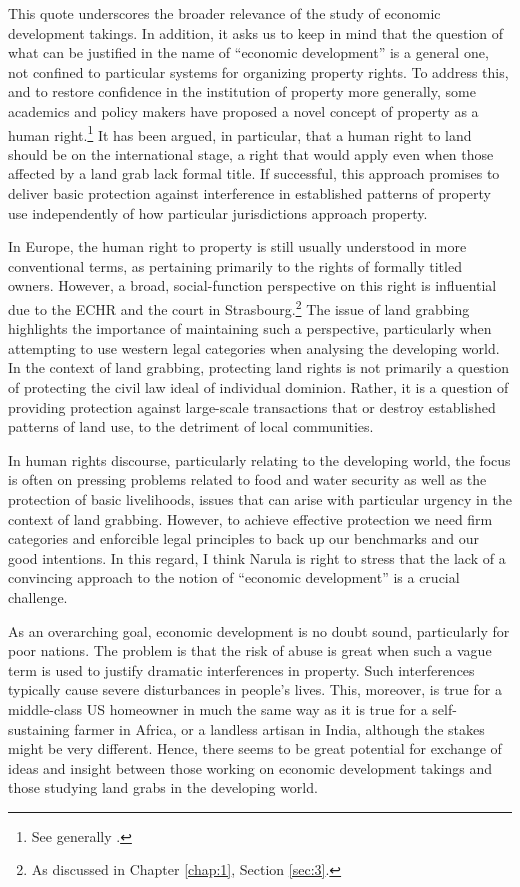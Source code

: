 This quote underscores the broader relevance of the study of economic development takings. In addition, it asks us to keep in mind that the question of what can be justified in the name of ``economic development'' is a general one, not confined to particular systems for organizing property rights. To address this, and to restore confidence in the institution of property more generally, some academics and policy makers have proposed a novel concept of property as a human right.\footnote{See generally \cite{schutter10,schutter11,kunnerman13}.} It has been argued, in particular, that a human right to land should be  on the international stage, a right that would apply even when those affected by a land grab lack formal title. If successful, this approach promises to deliver basic protection against interference in established patterns of property use independently of how particular jurisdictions approach property.

In Europe, the human right to property is still usually understood in more conventional terms, as pertaining primarily to the rights of formally titled owners. However, a broad, social-function perspective on this right is influential due to the ECHR and the court in Strasbourg.\footnote{As discussed in Chapter \ref{chap:1}, Section \ref{sec:3}.} The issue of land grabbing highlights the importance of maintaining such a perspective, particularly when attempting to use western legal categories when analysing the developing world. In the context of land grabbing, protecting land rights is not primarily a question of protecting the civil law ideal of individual dominion. Rather, it is a question of providing protection against large-scale transactions that  or destroy established patterns of land use, to the detriment of local communities. 

In human rights discourse, particularly relating to the developing world, the focus is often on pressing problems related to food and water security as well as the protection of basic livelihoods, issues that can arise with particular urgency in the context of land grabbing. However, to achieve effective protection we need firm categories and enforcible legal principles to back up our benchmarks and our good intentions. In this regard, I think Narula is right to stress that the lack of a convincing approach to the notion of ``economic development'' is a crucial challenge.

As an overarching goal, economic development is no doubt sound, particularly for poor nations. The problem is that the risk of abuse is great when such a vague term is used to justify dramatic interferences in property. Such interferences typically cause severe disturbances in people's lives. This, moreover, is true for a middle-class US homeowner in much the same way as it is true for a self-sustaining farmer in Africa, or a landless artisan in India, although the stakes might be very different. Hence, there seems to be great potential for exchange of ideas and insight between those working on economic development takings and those studying land grabs in the developing world.


